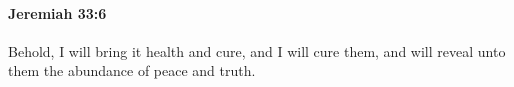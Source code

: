 
		\paragraph{Jeremiah 33:6} %
			\label{JEREMIAH-33-6}

			Behold, I will bring it health and cure, and I will cure them, and will reveal unto them the abundance of peace and truth.


